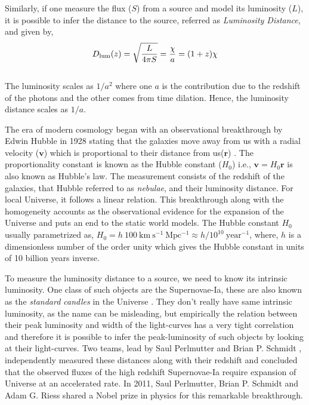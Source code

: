 \documentclass[
  11pt,
  twoside,
  openright,
  titlepage,
  headings=optiontoheadandtoc
]{scrbook}
\begin{document}
Similarly, if one measure the flux ($S$) from a source and model its luminosity ($L$), it is
possible to infer the distance to the source, referred as {\it Luminosity Distance}, and 
given by,
\begin{equation}
	D_{\rm lum}(z) = \sqrt{\dfrac{L}{4\pi S}} = \dfrac{\chi}{a} = (1+z)\chi
\end{equation}
\\
The luminosity scales as $1/a^2$ where one $a$ is the contribution due to the redshift of
the photons and the other comes from time dilation. Hence, the luminosity distance scales
as $1/a$.

The era of modern cosmology began with an observational breakthrough by Edwin Hubble 
in 1928 stating that the galaxies move away from us with a radial velocity ($\mathbf{v}$) which
is proportional to their distance from us($\mathbf{r}$) \citep{1929PNAS...15..168H}. 
The proportionality constant is known
as the Hubble constant ($H_0$) i.e., $\mathbf{v}=H_0 \mathbf{r}$ is also known as Hubble's law. 
The measurement consists of the redshift of the galaxies, that Hubble referred to as
{\it nebulae}, and their luminosity distance. For local Universe, it follows
a linear relation. 
This breakthrough along with the
homogeneity accounts as the observational evidence for the expansion of the Universe and
puts an end to the static world models. The Hubble constant $H_0$ usually parametrized as, 
$H_0 = h\ 100\ \mathrm{km\ s^{-1}\ Mpc^{-1}} \approx h/10^{10}\ \mathrm{year^{-1}}$,
where, $h$ is a dimensionless number of the order unity which gives the 
Hubble constant in units of 10 billion years inverse. 

To measure the luminosity distance to a source, we need to 
know its intrinsic luminosity. One class of such objects are the Supernovae-Ia, 
these are also known as the {\it standard candles} in the Universe
\citep{1993ApJ...405L...5B,2007AIPC..924..330D}. They
don't really have same intrinsic luminosity, as the name can be misleading, but 
empirically the relation between their peak luminosity and width of the light-curves
has a very tight correlation and therefore it is possible to infer the peak-luminosity
of such objects by looking at their light-curves. Two teams, lead by Saul Perlmutter
\citep{1999ApJ...517..565P} and
Brian P. Schmidt \citep{1998ApJ...507...46S}, 
independently measured these distances along with their redshift and
concluded that the observed fluxes of the high redshift Supernovae-Ia require expansion of 
Universe at an accelerated rate. In 2011, Saul Perlmutter, 
Brian P. Schmidt and Adam G. Riess
shared a Nobel prize in physics for this remarkable breakthrough. 
\end{document}
